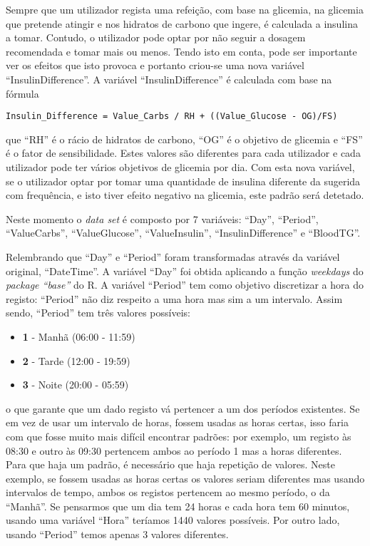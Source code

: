 Sempre que um utilizador regista uma refeição, com base na glicemia, na glicemia que pretende atingir e nos hidratos de carbono que ingere, é calculada a insulina a tomar. Contudo, o utilizador pode optar por não seguir a dosagem recomendada e tomar mais ou menos. Tendo isto em conta, pode ser importante ver os efeitos que isto provoca e portanto criou-se uma nova variável ``Insulin\textunderscore Difference''. 
A variável ``Insulin\textunderscore Difference'' é calculada com base na fórmula\newline\newline

\begin{lstlisting}
Insulin_Difference = Value_Carbs / RH + ((Value_Glucose - OG)/FS)
\end{lstlisting}
que ``RH'' é o rácio de hidratos de carbono, ``OG''  é o objetivo de glicemia e ``FS''  é o fator de sensibilidade. Estes valores são diferentes para cada utilizador e cada utilizador pode ter vários objetivos de glicemia por dia. 
Com esta nova variável, se o utilizador optar por tomar uma quantidade de insulina diferente da sugerida com frequência, e isto tiver efeito negativo na glicemia, este padrão será detetado. 

Neste momento o \textit{data set} é composto por 7 variáveis: ``Day'', ``Period'', ``Value\textunderscore Carbs'', ``Value\textunderscore Glucose'', ``Value\textunderscore Insulin'', ``Insulin\textunderscore Difference'' e ``Blood\textunderscore TG''.



Relembrando que ``Day'' e ``Period'' foram transformadas através da variável original, ``DateTime''. A variável ``Day'' foi obtida aplicando a função \textit{weekdays} do \textit{package ``base''} do R. A variável ``Period'' tem como objetivo discretizar a hora do registo: ``Period'' não diz respeito a uma hora mas sim a um intervalo. Assim sendo, ``Period'' tem três valores possíveis:

\begin{itemize}
\item \textbf{1} - Manhã (06:00 - 11:59)
\item \textbf{2} - Tarde (12:00 - 19:59)
\item \textbf{3} - Noite (20:00 - 05:59)
\end{itemize}
o que garante que um dado registo vá pertencer a um dos períodos existentes. Se em vez de usar um intervalo de horas, fossem usadas as horas certas, isso faria com que fosse muito mais difícil encontrar padrões: por exemplo, um registo às 08:30 e outro às 09:30 pertencem ambos ao período 1 mas a horas diferentes. Para que haja um padrão, é necessário que haja repetição de valores. Neste exemplo, se fossem usadas as horas certas os valores seriam diferentes mas usando intervalos de tempo, ambos os registos pertencem ao mesmo período, o da ``Manhã''. Se pensarmos que um dia tem 24 horas e cada hora tem 60 minutos, usando uma variável ``Hora'' teríamos 1440 valores possíveis. Por outro lado, usando ``Period'' temos apenas 3 valores diferentes. 

